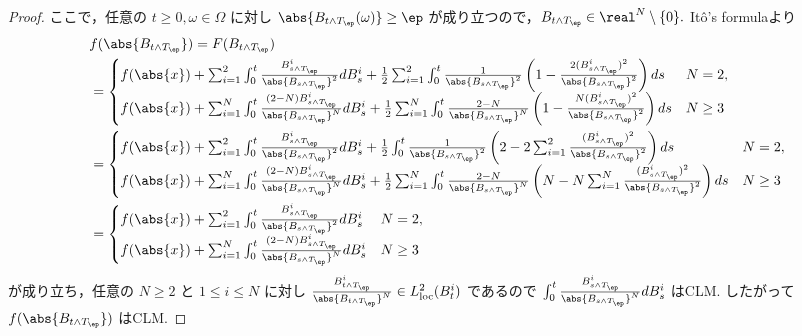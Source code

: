 \documentclass{jsarticle}
\begin{document}
\begin{enumerate}
\begin{proof}
        ここで，任意の $t\ge0,\omega\in\Omega$ に対し $\abs{B_{t\wedge T_\ep}(\omega)}\ge\ep$ が成り立つので，$B_{t\wedge T_\ep}\in\real^N\setminus\{0\}.$
        It\^{o}'s formulaより
        \begin{align}
            & f(\abs{B_{t\wedge T_\ep}})
            = F(B_{t\wedge T_\ep}) \\
            &= 
            \begin{cases}
                f(\abs{x})
                + \sum_{i=1}^{2}\int_0^t\frac{B_{s\wedge T_\ep}^i}{\abs{B_{s\wedge T_\ep}}^2}dB_s^i
                + \frac{1}{2}\sum_{i=1}^{2}\int_0^t\frac{1}{\abs{B_{s\wedge T_\ep}}^2}\left(1-\frac{2(B_{s\wedge T_\ep}^i)^2}{\abs{B_{s\wedge T_\ep}}^2}\right)ds & N=2, \\
                f(\abs{x})
                + \sum_{i=1}^{N}\int_0^t\frac{(2-N)B_{s\wedge T_\ep}^i}{\abs{B_{s\wedge T_\ep}}^N}dB_s^i
                + \frac{1}{2}\sum_{i=1}^{N}\int_0^t\frac{2-N}{\abs{B_{s\wedge T_\ep}}^N}\left(1-\frac{N(B_{s\wedge T_\ep}^i)^2}{\abs{B_{s\wedge T_\ep}}^2}\right)ds & N\ge3
            \end{cases} \\
            &= 
            \begin{cases}
                f(\abs{x})
                + \sum_{i=1}^{2}\int_0^t\frac{B_{s\wedge T_\ep}^i}{\abs{B_{s\wedge T_\ep}}^2}dB_s^i
                + \frac{1}{2}\int_0^t\frac{1}{\abs{B_{s\wedge T_\ep}}^2}\left(2-2\sum_{i=1}^{2}\frac{(B_{s\wedge T_\ep}^i)^2}{\abs{B_{s\wedge T_\ep}}^2}\right)ds & N=2, \\
                f(\abs{x})
                + \sum_{i=1}^{N}\int_0^t\frac{(2-N)B_{s\wedge T_\ep}^i}{\abs{B_{s\wedge T_\ep}}^N}dB_s^i
                + \frac{1}{2}\sum_{i=1}^{N}\int_0^t\frac{2-N}{\abs{B_{s\wedge T_\ep}}^N}\left(N-N\sum_{i=1}^{N}\frac{(B_{s\wedge T_\ep}^i)^2}{\abs{B_{s\wedge T_\ep}}^2}\right)ds & N\ge3
            \end{cases} \\
            &= 
            \begin{cases}
                f(\abs{x})
                + \sum_{i=1}^{2}\int_0^t\frac{B_{s\wedge T_\ep}^i}{\abs{B_{s\wedge T_\ep}}^2}dB_s^i & N=2, \\
                f(\abs{x})
                + \sum_{i=1}^{N}\int_0^t\frac{(2-N)B_{s\wedge T_\ep}^i}{\abs{B_{s\wedge T_\ep}}^N}dB_s^i & N\ge3
            \end{cases}
        \end{align}
        が成り立ち，任意の $N\ge2$ と $1\le i\le N$ に対し $\frac{B_{t\wedge T_\ep}^i}{\abs{B_{t\wedge T_\ep}}^N}\in L_{\mathrm{loc}}^2(B_t^i)$ であるので $\int_0^t\frac{B_{s\wedge T_\ep}^i}{\abs{B_{s\wedge T_\ep}}^N}dB_s^i$ はCLM.
        したがって $f(\abs{B_{t\wedge T_\ep}})$ はCLM.
    \end{proof}
    

\end{enumerate}
\end{document}
